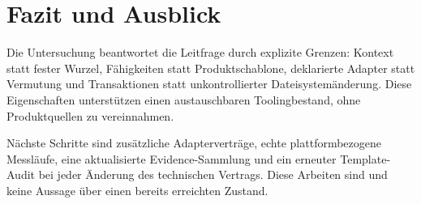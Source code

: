 \section{Fazit und Ausblick}
\label{chap:conclusion-outlook}

Die Untersuchung beantwortet die Leitfrage durch explizite Grenzen: Kontext statt fester
Wurzel, Fähigkeiten statt Produktschablone, deklarierte Adapter statt Vermutung und
Transaktionen statt unkontrollierter Dateisystemänderung. Diese Eigenschaften unterstützen
einen austauschbaren Toolingbestand, ohne Produktquellen zu vereinnahmen.

Nächste Schritte sind zusätzliche Adapterverträge, echte plattformbezogene Messläufe,
eine aktualisierte Evidence-Sammlung und ein erneuter Template-Audit bei jeder Änderung
des technischen Vertrags. Diese Arbeiten sind \Planned{} und keine Aussage über einen
bereits erreichten Zustand.
